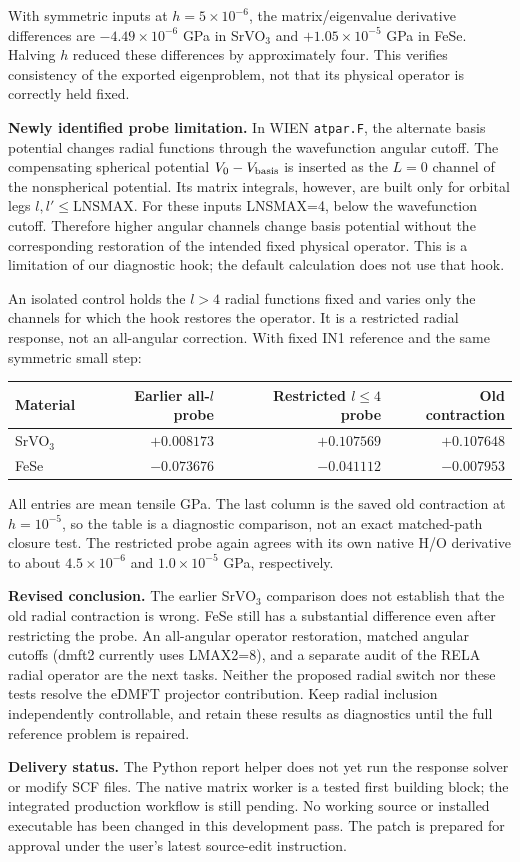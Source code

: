 \documentclass[11pt]{article}
\begin{document}
With symmetric inputs at $h=5\times10^{-6}$, the matrix/eigenvalue derivative differences are $-4.49\times10^{-6}$ GPa in SrVO$_3$ and $+1.05\times10^{-5}$ GPa in FeSe. Halving $h$ reduced these differences by approximately four. This verifies consistency of the exported eigenproblem, not that its physical operator is correctly held fixed.

\textbf{Newly identified probe limitation.} In WIEN \texttt{atpar.F}, the alternate basis potential changes radial functions through the wavefunction angular cutoff. The compensating spherical potential $V_0-V_{\rm basis}$ is inserted as the $L=0$ channel of the nonspherical potential. Its matrix integrals, however, are built only for orbital legs $l,l'\leq\mathrm{LNSMAX}$. For these inputs LNSMAX=4, below the wavefunction cutoff. Therefore higher angular channels change basis potential without the corresponding restoration of the intended fixed physical operator. This is a limitation of our diagnostic hook; the default calculation does not use that hook.

An isolated control holds the $l>4$ radial functions fixed and varies only the channels for which the hook restores the operator. It is a restricted radial response, not an all-angular correction. With fixed IN1 reference and the same symmetric small step:
\begin{center}\small
\begin{tabular}{lrrr}\toprule
Material & Earlier all-$l$ probe & Restricted $l\leq4$ probe & Old contraction\\\midrule
SrVO$_3$ & $+0.008173$ & $+0.107569$ & $+0.107648$\\
FeSe & $-0.073676$ & $-0.041112$ & $-0.007953$\\\bottomrule
\end{tabular}
\end{center}
All entries are mean tensile GPa. The last column is the saved old contraction at $h=10^{-5}$, so the table is a diagnostic comparison, not an exact matched-path closure test. The restricted probe again agrees with its own native H/O derivative to about $4.5\times10^{-6}$ and $1.0\times10^{-5}$ GPa, respectively.

\textbf{Revised conclusion.} The earlier SrVO$_3$ comparison does not establish that the old radial contraction is wrong. FeSe still has a substantial difference even after restricting the probe. An all-angular operator restoration, matched angular cutoffs (dmft2 currently uses LMAX2=8), and a separate audit of the RELA radial operator are the next tasks. Neither the proposed radial switch nor these tests resolve the eDMFT projector contribution. Keep radial inclusion independently controllable, and retain these results as diagnostics until the full reference problem is repaired.

\textbf{Delivery status.} The Python report helper does not yet run the response solver or modify SCF files. The native matrix worker is a tested first building block; the integrated production workflow is still pending. No working source or installed executable has been changed in this development pass. The patch is prepared for approval under the user's latest source-edit instruction.
\end{document}
